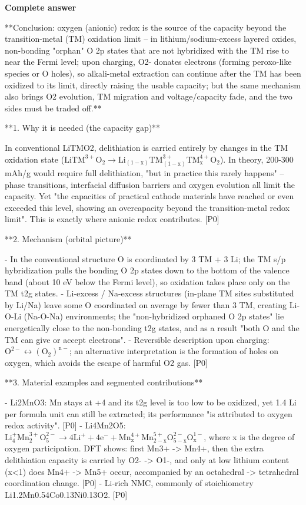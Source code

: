 \documentclass[10pt]{article}
\begin{document}
\textbf{Complete answer}
\begin{AnswerText}
**Conclusion: oxygen (anionic) redox is the source of the capacity beyond the transition-metal (TM) oxidation limit -- in lithium/sodium-excess layered oxides, non-bonding "orphan" O 2p states that are not hybridized with the TM rise to near the Fermi level; upon charging, O2- donates electrons (forming peroxo-like species or O holes), so alkali-metal extraction can continue after the TM has been oxidized to its limit, directly raising the usable capacity; but the same mechanism also brings O2 evolution, TM migration and voltage/capacity fade, and the two sides must be traded off.**

**1. Why it is needed (the capacity gap)**

In conventional LiTMO2, delithiation is carried entirely by changes in the TM oxidation state ($\mathrm{LiTM^{3+}O_2 \to Li_{(1-x)}TM_{(1-x)}^{3+}TM_x^{4+}O_2}$). In theory, 200-300 mAh/g would require full delithiation, "but in practice this rarely happens" -- phase transitions, interfacial diffusion barriers and oxygen evolution all limit the capacity. Yet "the capacities of practical cathode materials have reached or even exceeded this level, showing an overcapacity beyond the transition-metal redox limit". This is exactly where anionic redox contributes. [P0]

**2. Mechanism (orbital picture)**

- In the conventional structure O is coordinated by 3 TM + 3 Li; the TM s/p hybridization pulls the bonding O 2p states down to the bottom of the valence band (about 10 eV below the Fermi level), so oxidation takes place only on the TM t2g states.
- Li-excess / Na-excess structures (in-plane TM sites substituted by Li/Na) leave some O coordinated on average by fewer than 3 TM, creating Li-O-Li (Na-O-Na) environments; the "non-hybridized orphaned O 2p states" lie energetically close to the non-bonding t2g states, and as a result "both O and the TM can give or accept electrons".
- Reversible description upon charging: $\mathrm{O^{2-} \leftrightarrow (O_2)^{n-}}$; an alternative interpretation is the formation of holes on oxygen, which avoids the escape of harmful O2 gas. [P0]

**3. Material examples and segmented contributions**

- Li2MnO3: Mn stays at +4 and its t2g level is too low to be oxidized, yet 1.4 Li per formula unit can still be extracted; its performance "is attributed to oxygen redox activity". [P0]
- Li4Mn2O5: $\mathrm{Li_4^+Mn_2^{3+}O_5^{2-} \to 4Li^+ + 4e^- + Mn_x^{4+}Mn_{2-x}^{5+}O_{5-x}^{2-}O_x^{1-}}$, where x is the degree of oxygen participation. DFT shows: first Mn3+ -> Mn4+, then the extra delithiation capacity is carried by O2- -> O1-, and only at low lithium content (x<1) does Mn4+ -> Mn5+ occur, accompanied by an octahedral -> tetrahedral coordination change. [P0]
- Li-rich NMC, commonly of stoichiometry Li1.2Mn0.54Co0.13Ni0.13O2. [P0]


\end{AnswerText}
\end{document}
